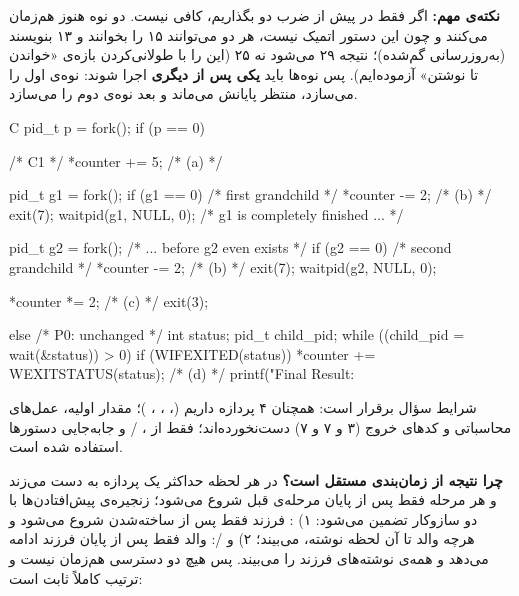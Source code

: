 \textbf{نکته‌ی مهم:} اگر فقط در  پیش از ضرب دو  بگذاریم، کافی نیست. دو نوه هنوز هم‌زمان  می‌کنند و چون این دستور اتمیک نیست، هر دو می‌توانند ۱۵ را بخوانند و ۱۳ بنویسند (به‌روزرسانی گم‌شده)؛ نتیجه ۲۹ می‌شود نه ۲۵ (این را با طولانی‌کردن بازه‌ی «خواندن تا نوشتن» آزموده‌ایم). پس نوه‌ها باید \textbf{یکی پس از دیگری} اجرا شوند:  نوه‌ی اول را می‌سازد، منتظر پایانش می‌ماند و بعد نوه‌ی دوم را می‌سازد.

\begin{codebox}[title=main.c (fixed)]{C}
pid_t p = fork();
if (p == 0) {                       /* C1 */
    *counter += 5;                  /* (a) */

    pid_t g1 = fork();
    if (g1 == 0) {                  /* first grandchild */
        *counter -= 2;              /* (b) */
        exit(7);
    }
    waitpid(g1, NULL, 0);           /* g1 is completely finished ... */

    pid_t g2 = fork();              /* ... before g2 even exists */
    if (g2 == 0) {                  /* second grandchild */
        *counter -= 2;              /* (b) */
        exit(7);
    }
    waitpid(g2, NULL, 0);

    *counter *= 2;                  /* (c) */
    exit(3);
} else {                            /* P0: unchanged */
    int status;
    pid_t child_pid;
    while ((child_pid = wait(&status)) > 0)
        if (WIFEXITED(status))
            *counter += WEXITSTATUS(status);   /* (d) */
    printf("Final Result: %
}
\end{codebox}

شرایط سؤال برقرار است: همچنان ۴ پردازه داریم (، ، ، )؛ مقدار اولیه، عمل‌های محاسباتی و کدهای خروج (۳ و ۷ و ۷) دست‌نخورده‌اند؛ فقط از ، / و جابه‌جایی دستورها استفاده شده است.

\textbf{چرا نتیجه از زمان‌بندی مستقل است؟} در هر لحظه حداکثر یک پردازه به  دست می‌زند و هر مرحله فقط پس از پایان مرحله‌ی قبل شروع می‌شود؛ زنجیره‌ی پیش‌افتادن‌ها با دو سازوکار تضمین می‌شود: ۱) : فرزند فقط پس از ساخته‌شدن شروع می‌شود و هرچه والد تا آن لحظه نوشته، می‌بیند؛ ۲)  و /: والد فقط پس از پایان فرزند ادامه می‌دهد و همه‌ی نوشته‌های فرزند را می‌بیند. پس هیچ دو دسترسی هم‌زمان نیست و ترتیب کاملاً ثابت است:

